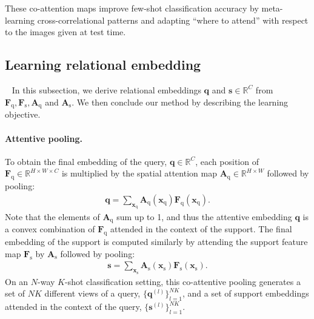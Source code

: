 \documentclass[10pt,twocolumn,letterpaper]{article}
\newcommand{\Real}{\mathbb{R}}
\newcommand{\bs}{\mathbf{s}}
\newcommand{\bq}{\mathbf{q}}
\newcommand{\bF}{\mathbf{F}}
\newcommand{\bA}{\mathbf{A}}
\newcommand{\bx}{\mathbf{x}}
\newcommand{\texts}{{\text{s}}}
\newcommand{\textq}{{\text{q}}}
\begin{document}
These co-attention maps improve few-shot classification accuracy by meta-learning cross-correlational patterns and adapting ``where to attend'' with respect to the images given at test time.




\subsection{Learning relational embedding}~\label{sec_CORE}
In this subsection, we derive relational embeddings $\bq$ and $\bs \in \Real^C$ from $\bF_\textq, \bF_\texts, \bA_\textq$ and $\bA_\texts$.
We then conclude our method by describing the learning objective.








\paragraph{Attentive pooling.}
To obtain the final embedding of the query, $\bq \in \Real^{C}$, each position of $\bF_\textq \in \Real^{H \times W \times C}$ is multiplied by the spatial attention map $\bA_\textq \in \Real^{H \times W}$ followed by pooling:
\begin{eqnarray}
	\bq = \sum_{\bx_\textq} \bA_\textq(\bx_\textq) \bF_\textq(\bx_\textq).\label{eq:attentive_pooling_q}
\end{eqnarray}
Note that the elements of $\bA_\textq$ sum up to 1, and thus the attentive embedding $\bq$ is a convex combination of $\bF_\textq$ attended in the context of the support.
The final embedding of the support is computed similarly by attending the support feature map $\bF_\texts$ by $\bA_\texts$ followed by pooling:
\begin{eqnarray}
	\bs = \sum_{\bx_\texts} \bA_\texts(\bx_\texts) \bF_\texts(\bx_\texts).\label{eq:attentive_pooling_s}
\end{eqnarray}
On an $N$-way $K$-shot classification setting, this co-attentive pooling generates a set of $NK$ different views of a query, $\{\bq^{(l)} \}_{l = 1}^{NK}$, and a set of support embeddings attended in the context of the query, $\{\bs^{(l)} \}_{l = 1}^{NK}$.
\end{document}
